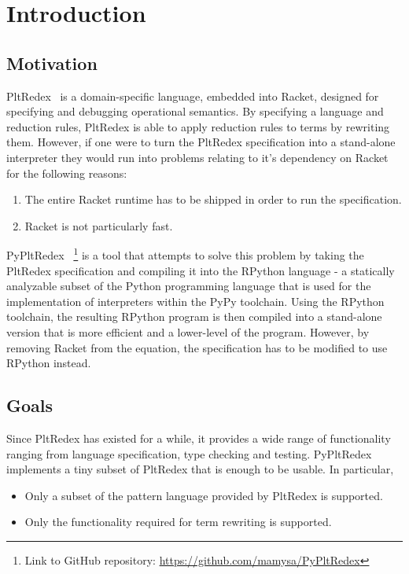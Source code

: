 \chapter{Introduction}
\section{Motivation}
PltRedex~\cite{pltredex} is a domain-specific language, embedded into Racket, designed for specifying and debugging operational semantics. By specifying a language and reduction rules, PltRedex is able to apply reduction rules to terms by rewriting them.
However, if one were to turn the PltRedex specification into a stand-alone interpreter they would run into problems relating to it's dependency on Racket for the following reasons:

\begin{enumerate}
\item
The entire Racket runtime has to be shipped in order to run the specification.
\item
Racket is not particularly fast.
\end{enumerate}

PyPltRedex~\cite{pypltredex-github} \footnote{Link to GitHub repository: \url{https://github.com/mamysa/PyPltRedex}} is a tool that attempts to solve this problem by taking the PltRedex specification and compiling it into the RPython language - a statically analyzable subset of the Python programming language that is used for the implementation of interpreters within the PyPy toolchain. Using the RPython toolchain, the resulting RPython program is then compiled into a stand-alone version that is more efficient and a lower-level of the program. However, by removing Racket from the equation, the specification has to be modified to use RPython instead.

\section{Goals}
Since PltRedex has existed for a while, it provides a wide range of functionality ranging from language specification, type checking and testing. PyPltRedex implements a tiny subset of PltRedex that is enough to be usable. In particular,

\begin{itemize}
\item Only a subset of the pattern language provided by PltRedex is supported.
\item
Only the functionality required for term rewriting is supported.
\end{itemize}

